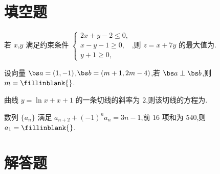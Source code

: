 \section{填空题}

\begin{problem}
若 \(x\),\(y\) 满足约束条件 \(\begin{cases}
2x+y-2\le 0,\\
x-y-1\ge 0,\\
y+1\ge 0,
\end{cases}\),则 \(z=x+7y\) 的最大值为\fillinblank{}.
\end{problem}

\begin{problem}
设向量 \(\bs a=(1,-1)\),\(\bs b=(m+1,2m-4)\),若 \(\bs a\perp\bs b\),则 \(m=\fillinblank{}\).
\end{problem}

\begin{problem}
曲线 \(y=\ln x+x+1\) 的一条切线的斜率为 \(2\),则该切线的方程为\fillinblank{}.
\end{problem}

\begin{problem}
数列 \(\{a_n\}\) 满足 \(a_{n+2}+(-1)^n a_n=3n-1\),前 \(16\) 项和为 \(540\),则 \(a_1=\fillinblank{}\).
\end{problem}

\section{解答题}

